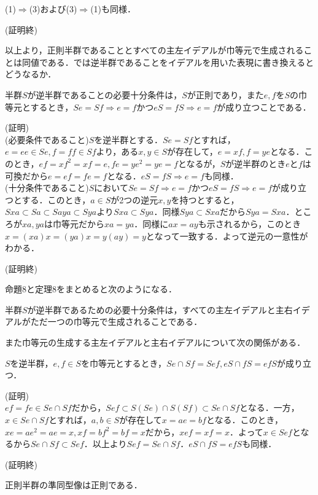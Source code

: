 (1)$\Rightarrow$(3)および(3)$\Rightarrow$(1)も同様．
\begin{flushright}
(証明終)
\end{flushright}
以上より，正則半群であることとすべての主左イデアルが巾等元で生成されることは同値である．では逆半群であることをイデアルを用いた表現に書き換えるとどうなるか．
\begin{sthm}
半群$S$が逆半群であることの必要十分条件は，$S$が正則であり，また$e,f$を$S$の巾等元とするとき，$Se=Sf\Rightarrow e=f$かつ$eS=fS\Rightarrow e=f$が成り立つことである．
\end{sthm}
(証明)\\
(必要条件であること)$S$を逆半群とする．$Se=Sf$とすれば，$e=ee\in Se, f=ff\in Sf$より，ある$x,y\in S$が存在して，$e=xf,f=ye$となる．このとき，$ef=xf^2=xf=e,fe=ye^2=ye=f$となるが，$S$が逆半群のとき$e$と$f$は可換だから$e=ef=fe=f$となる．$eS=fS\Rightarrow e=f$も同様．\\
(十分条件であること)$S$において$Se=Sf\Rightarrow e=f$かつ$eS=fS\Rightarrow e=f$が成り立つとする．このとき，$a\in S$が2つの逆元$x,y$を持つとすると，$Sxa\subset Sa\subset Saya\subset Sya$より$Sxa\subset Sya$．同様$Sya\subset Sxa$だから$Sya=Sxa$．ところが$xa,ya$は巾等元だから$xa=ya$．同様に$ax=ay$も示されるから，このとき$x=(xa)x=(ya)x=y(ay)=y$となって一致する．よって逆元の一意性がわかる．
\begin{flushright}
(証明終)
\end{flushright}
命題8と定理8をまとめると次のようになる．
\begin{sthm}
半群$S$が逆半群であるための必要十分条件は，すべての主左イデアルと主右イデアルがただ一つの巾等元で生成されることである．
\end{sthm}
また巾等元の生成する主左イデアルと主右イデアルについて次の関係がある．
\begin{sprop}
$S$を逆半群，$e,f\in S$を巾等元とするとき，$Se\cap Sf=Sef, eS\cap fS=efS$が成り立つ．
\end{sprop}
(証明)\\
$ef=fe\in Se\cap Sf$だから，$Sef\subset S(Se)\cap S(Sf)\subset Se\cap Sf$となる．一方，$x\in Se \cap Sf$とすれば，$a,b\in S$が存在して$x=ae=bf$となる．このとき，$xe=ae^2=ae=x,xf=bf^2=bf=x$だから，$xef=xf=x$．よって$x\in Sef$となるから$Se\cap Sf\subset Sef$．以上より$Sef=Se\cap Sf$．$eS\cap fS=efS$も同様．
\begin{flushright}
(証明終)
\end{flushright}
\begin{sprop}
正則半群の準同型像は正則である．
\end{sprop}
